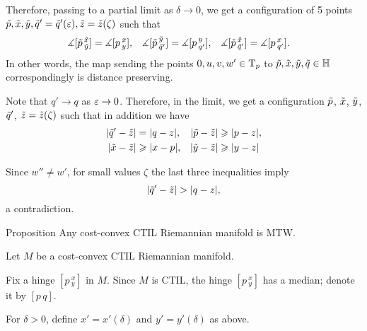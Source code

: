 Therefore, passing to a partial limit as $\delta\to0$, we get a configuration of 5 points 
$\~p, \~x,\~y,\~q'=\~q'(\eps),\~z=\~z(\zeta)$ such that  
\begin{align*}
\measuredangle[\~p\,^{\~x}_{\~y}]&= \measuredangle[p\,^{x}_{y}],
&
\measuredangle[\~p\,^{\~y}_{\~q'}]&= \measuredangle[p\,^{y}_{q'}],
&
\measuredangle[\~p\,^{\~x}_{\~q'}]&= \measuredangle[p\,^{x}_{q'}].
\end{align*}
In other words, the map sending the points $0,u,v,w'\in\T_p$ to $\~p,\~x,\~y,\~q\in\HH$ correspondingly is distance preserving.

Note that $q'\to q$ as $\eps\to0$. 
Therefore, in the limit,
we get a configuration $\~p$, $\~x$, $\~y$, $\~q'$, $\~z=\~z(\zeta)$ such that in addition we have
\begin{align*}
|\~q'-\~z|&=|q-z|,
&
|\~p-\~z|&\ge |p-z|,
\\
|\~x-\~z|&\ge |x-p|,
&
|\~y-\~z|&\ge |y-z|
\end{align*}

Since $w''\ne w'$, for small values $\zeta$ the last three inequalities 
imply 
\[|\~q'-\~z|>|q-z|,\]
a contradiction.


\begin{thm}{Proposition}\label{prop:CTIL}
Any cost-convex CTIL Riemannian manifold is MTW.
\end{thm}


Let $M$ be a cost-convex CTIL Riemannian manifold.

Fix a hinge $[p\,^x_y]$ in $M$.
Since $M$ is CTIL, the hinge $[p\,^x_y]$ has a median; denote it by $[p\,q]$.

For $\delta>0$, define $x'=x'(\delta)$ and $y'=y'(\delta)$ as above.

\begin{wrapfigure}{r}{35 mm}
\end{wrapfigure}

